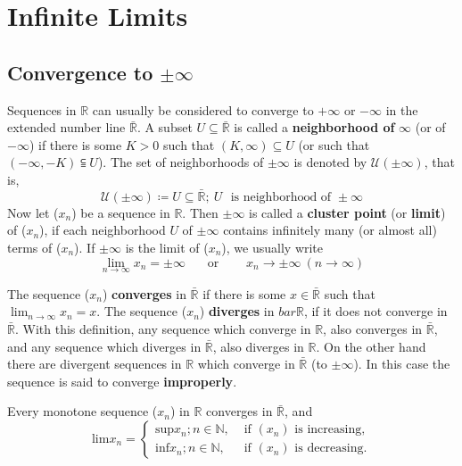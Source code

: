 \chapter{Infinite Limits}

\section{Convergence to \(\pm\infty\)}

Sequences in \(\mathbb{R}\) can usually be considered to converge to \(+\infty\)
or \(-\infty\) in the extended number line \(\bar{\mathbb{R}}\). A subset \(U \subseteq
\bar{\mathbb{R}}\) is called a \textbf{neighborhood of} \(\infty\) (or of \(-\infty\))
if there is some \(K > 0\) such that \(\left(K, \infty\right) \subseteq U\) (or such
that \(\left(-\infty, -K\right) \subseteqq U\)). The set of neighborhoods of 
\(\pm\infty\) is denoted by \(\mathcal{U}\left(\pm\infty\right)\), that is,
\[
    \mathcal{U}(\pm \infty) \coloneqq {U \subseteq \bar{\mathbb{R}}; \:
    U \:\:\: \text{is neighborhood of } \pm\infty}
\]
Now let (\(x_n\)) be a sequence in \(\mathbb{R}\). Then \(\pm\infty\) is called a
\textbf{cluster point} (or \textbf{limit}) of (\(x_n\)), if each neighborhood \(U\)
of \(\pm\infty\) contains infinitely many (or almost all) terms of (\(x_n\)). If 
\(\pm\infty\) is the limit of (\(x_n\)), we usually write 
\[
  \displaystyle \lim_{n \to \infty} x_n = \pm \infty \:\:\:\:\:\:\:\: \text{or}
  \:\:\:\:\:\:\:\:\:\: x_n \to \pm\infty \:(n \to \infty)  
\]

The sequence (\(x_n\)) \textbf{converges} in \(\bar{\mathbb{R}}\) if there is some
\(x \in \bar{\mathbb{R}}\) such that \(\displaystyle\lim_{n\to\infty}x_n = x\). The 
sequence (\(x_n\)) \textbf{diverges} in \(bar{\mathbb{R}}\), if it does not converge
in \(\bar{\mathbb{R}}\). With this definition, any sequence which converge in 
\(\mathbb{R}\), also converges in \(\bar{\mathbb{R}}\), and any sequence which diverges
in \(\bar{\mathbb{R}}\), also diverges in \(\mathbb{R}\). On the other hand there are 
divergent sequences in \(\mathbb{R}\) which converge in \(\bar{\mathbb{R}}\) (to \(\pm\infty\)).
In this case the sequence is said to converge \textbf{improperly}. 

\begin{proposition}
    Every monotone sequence (\(x_n\)) in \(\mathbb{R}\) converges in \(\bar{\mathbb{R}}\),
    and
    \[
        \text{lim}x_n =  
        \begin{cases}
            \text{sup}{x_n ; n \in \mathbb{N}}, & \text{ if } (x_n) \text{ is increasing}, \\ 
            \text{inf}{x_n ; n \in \mathbb{N}}, & \text{ if } (x_n) \text{ is decreasing}. 
        \end{cases}
    \]
\end{proposition}

